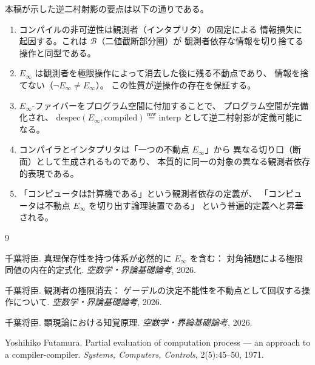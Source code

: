 \documentclass[11pt,a4paper]{article}
\newcommand{\mweq}{\mathrel{\overset{\mathrm{mw}}{=}}}
\newcommand{\Einfty}{E_\infty}
\theoremstyle{definition}
\begin{document}
本稿が示した逆二村射影の要点は以下の通りである。

\begin{enumerate}[label=(\arabic*)]
  \item コンパイルの非可逆性は観測者（インタプリタ）の固定による
        情報損失に起因する。これは $\mathcal{B}$（二値截断部分圏）が
        観測者依存な情報を切り捨てる操作と同型である。

  \item $\Einfty$ は観測者を極限操作によって消去した後に残る不動点であり、
        情報を捨てない（$\neg \Einfty \neq \Einfty$）。
        この性質が逆操作の存在を保証する。

  \item $\Einfty$-ファイバーをプログラム空間に付加することで、
        プログラム空間が完備化され、
        $\mathrm{despec}(\Einfty, \text{compiled}) \mweq \text{interp}$
        として逆二村射影が定義可能になる。

  \item コンパイラとインタプリタは「一つの不動点 $\Einfty$」から
        異なる切り口（断面）として生成されるものであり、
        本質的に同一の対象の異なる観測者依存的表現である。

  \item 「コンピュータは計算機である」という観測者依存の定義が、
        「コンピュータは不動点 $\Einfty$ を切り出す論理装置である」
        という普遍的定義へと昇華される。
\end{enumerate}

\begin{thebibliography}{9}

千葉将臣.
\newblock 真理保存性を持つ体系が必然的に $E_\infty$ を含む：
対角補題による極限同値の内在的定式化.
\newblock \emph{空数学・界論基礎論考}, 2026.

千葉将臣.
\newblock 観測者の極限消去：
ゲーデルの決定不能性を不動点として回収する操作について.
\newblock \emph{空数学・界論基礎論考}, 2026.

千葉将臣.
\newblock 顕現論における知覚原理.
\newblock \emph{空数学・界論基礎論考}, 2026.

Yoshihiko Futamura.
\newblock Partial evaluation of computation process ---
an approach to a compiler-compiler.
\newblock \emph{Systems, Computers, Controls}, 2(5):45--50, 1971.

\end{thebibliography}
\end{document}
